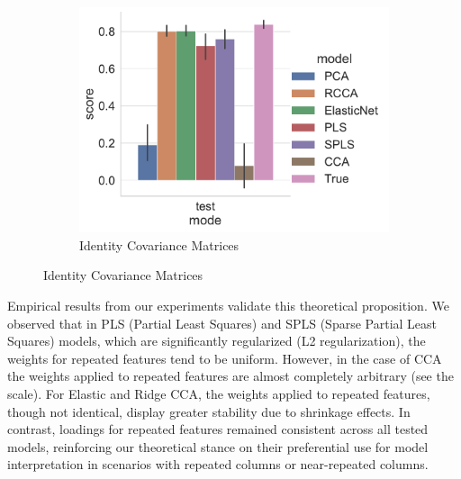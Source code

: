 \begin{figure}
\centering
\begin{subfigure}{0.49\linewidth}
\centering
\includegraphics[width=\linewidth]{figures/simulated/repeated/Train_Test_Scores_Identity_Covariance_implicit}
\caption{Identity Covariance Matrices}
\end{subfigure}
\end{figure}

Empirical results from our experiments validate this theoretical proposition.
We observed that in PLS (Partial Least Squares) and SPLS (Sparse Partial Least Squares) models, which are significantly regularized (L2 regularization), the weights for repeated features tend to be uniform.
However, in the case of CCA the weights applied to repeated features are almost completely arbitrary (see the scale).
For Elastic and Ridge CCA, the weights applied to repeated features, though not identical, display greater stability due to shrinkage effects.
In contrast, loadings for repeated features remained consistent across all tested models, reinforcing our theoretical stance on their preferential use for model interpretation in scenarios with repeated columns or near-repeated columns.

%

